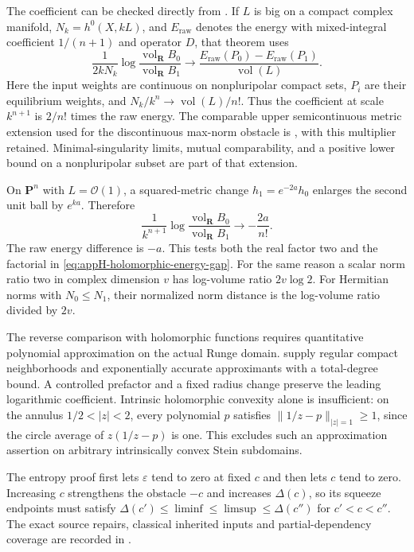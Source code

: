 The coefficient can be checked directly from
\cite[Theorem~A]{BB10}. If $L$ is big on a compact complex
manifold, $N_k=h^0(X,kL)$, and $E_{\mathrm{raw}}$ denotes
the energy with mixed-integral coefficient $1/(n+1)$ and
operator $D$, that theorem uses
\[
 \frac{1}{2kN_k}\log\frac{\operatorname{vol}_{\mathbf R}B_0}
                              {\operatorname{vol}_{\mathbf R}B_1}
 \longrightarrow
 \frac{E_{\mathrm{raw}}(P_0)-E_{\mathrm{raw}}(P_1)}
      {\operatorname{vol}(L)}.
 \tag{H.144}\label{eq:appH-holomorphic-volume-normalization}
\]
Here the input weights are continuous on nonpluripolar compact
sets, $P_i$ are their equilibrium weights, and
$N_k/k^n\to\operatorname{vol}(L)/n!$.
Thus the coefficient at scale $k^{n+1}$ is $2/n!$ times
the raw energy. The comparable upper semicontinuous metric
extension used for the discontinuous max-norm obstacle is
\cite[Lemma~4.7]{Finski26Kodaira}, with this multiplier
retained. Minimal-singularity limits, mutual comparability,
and a positive lower bound on a nonpluripolar subset are
part of that extension.

On $\mathbf P^n$ with $L=\mathcal O(1)$, a squared-metric
change $h_1=e^{-2a}h_0$ enlarges the second unit ball by
$e^{ka}$. Therefore
\[
 \frac{1}{k^{n+1}}\log
       \frac{\operatorname{vol}_{\mathbf R}B_0}
            {\operatorname{vol}_{\mathbf R}B_1}
       \longrightarrow-\frac{2a}{n!}.
 \tag{H.145}\label{eq:appH-holomorphic-volume-constant-test}
\]
The raw energy difference is $-a$. This tests both the real
factor two and the factorial in \eqref{eq:appH-holomorphic-energy-gap}.
For the same reason a scalar norm ratio two in complex
dimension $v$ has log-volume ratio $2v\log2$. For Hermitian norms with
$N_0\leq N_1$, their normalized norm distance is the
log-volume ratio divided by $2v$.

The reverse comparison with holomorphic functions requires
quantitative polynomial approximation on the actual Runge
domain. \cite[Theorem~3.16, Theorem~5.4 and Corollary~5.5]
{Zeriahi91ParabolicPublished} supply regular compact
neighborhoods and exponentially accurate approximants with
a total-degree bound. A controlled prefactor and a fixed
radius change preserve the leading logarithmic coefficient.
Intrinsic holomorphic convexity alone is insufficient: on
the annulus $1/2<|z|<2$, every polynomial $p$ satisfies
$\|1/z-p\|_{|z|=1}\geq1$, since the circle average of
$z(1/z-p)$ is one. This excludes such an approximation
assertion on arbitrary intrinsically convex Stein subdomains.

The entropy proof first lets $\varepsilon$ tend to zero at
fixed $c$ and then lets $c$ tend to zero. Increasing $c$ strengthens
the obstacle $-c$ and increases $\Delta(c)$, so its squeeze
endpoints must satisfy
$\Delta(c')\leq\liminf\leq\limsup\leq\Delta(c'')$
for $c'<c<c''$. The exact source repairs, classical inherited
inputs and partial-dependency coverage are recorded in
.

